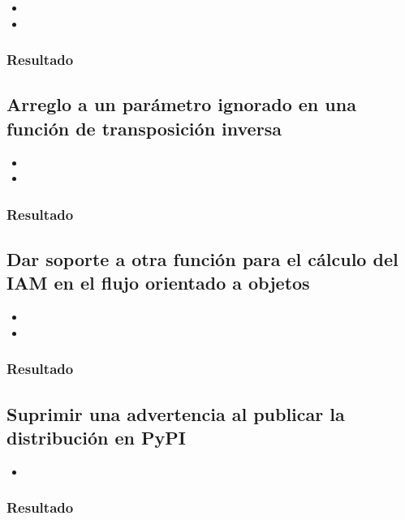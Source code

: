 \begin{itemize}
    \item {}
    \item {}
\end{itemize}
\subsubsection{Resultado}

\subsection{Arreglo a un parámetro ignorado en una función de transposición inversa}

\begin{itemize}
    \item {}
    \item {}
\end{itemize}
\subsubsection{Resultado}

\subsection{Dar soporte a otra función para el cálculo del IAM en el flujo orientado a objetos}

\begin{itemize}
    \item {}
    \item {}
\end{itemize}
\subsubsection{Resultado}

\subsection{Suprimir una advertencia al publicar la distribución en PyPI}

\begin{itemize}
    \item {}
\end{itemize}

\subsubsection{Resultado}

